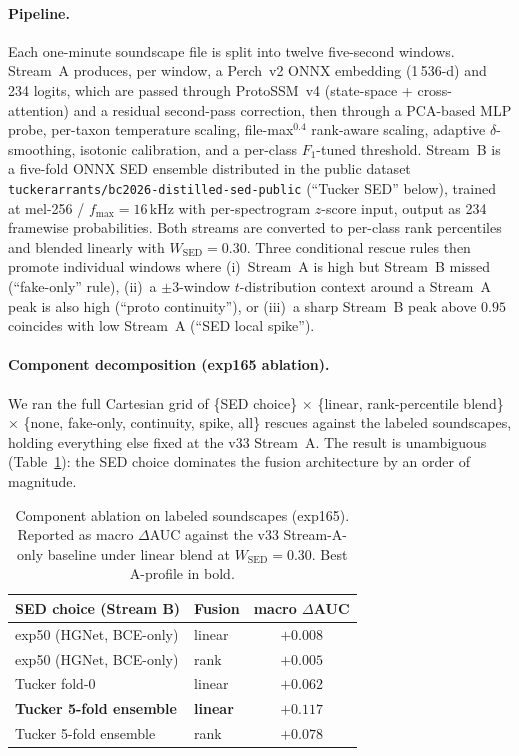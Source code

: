 \paragraph{Pipeline.}
Each one-minute soundscape file is split into twelve five-second
windows. Stream~A produces, per window, a Perch~v2 ONNX embedding
(1\,536-d) and 234 logits, which are passed through ProtoSSM~v4
(state-space + cross-attention) and a residual second-pass
correction, then through a PCA-based MLP probe, per-taxon
temperature scaling, file-max$^{0.4}$ rank-aware scaling, adaptive
$\delta$-smoothing, isotonic calibration, and a per-class
$F_1$-tuned threshold. Stream~B is a five-fold ONNX SED ensemble
distributed in the public dataset \texttt{tuckerarrants/bc2026-distilled-sed-public}
(``Tucker SED'' below), trained at mel-256 / $f_\text{max}=16$\,kHz
with per-spectrogram $z$-score input, output as 234 framewise
probabilities. Both streams are converted to per-class rank
percentiles and blended linearly with $W_\text{SED}=0.30$. Three
conditional rescue rules then promote individual windows where
(i)~Stream~A is high but Stream~B missed (``fake-only'' rule),
(ii)~a $\pm 3$-window $t$-distribution context around a
Stream~A peak is also high (``proto continuity''), or (iii)~a
sharp Stream~B peak above $0.95$ coincides with low Stream~A
(``SED local spike'').

\paragraph{Component decomposition (exp165 ablation).}
We ran the full Cartesian grid of \{SED choice\} $\times$
\{linear, rank-percentile blend\} $\times$ \{none, fake-only,
continuity, spike, all\} rescues against the labeled soundscapes,
holding everything else fixed at the v33 Stream~A. The result is
unambiguous (Table~\ref{tab:exp165}): the SED choice dominates the
fusion architecture by an order of magnitude.

\begin{table}[h]
\centering
\caption{Component ablation on labeled soundscapes (exp165).
Reported as macro $\Delta$AUC against the v33 Stream-A-only baseline
under linear blend at $W_\text{SED}=0.30$. Best A-profile in bold.}
\label{tab:exp165}
\begin{tabular}{llc}
\hline
SED choice (Stream B) & Fusion & macro $\Delta$AUC \\
\hline
exp50 (HGNet, BCE-only)         & linear  & $+0.008$ \\
exp50 (HGNet, BCE-only)         & rank    & $+0.005$ \\
Tucker fold-0                   & linear  & $+0.062$ \\
\textbf{Tucker 5-fold ensemble} & \textbf{linear} & $\mathbf{+0.117}$ \\
Tucker 5-fold ensemble          & rank    & $+0.078$ \\
\hline
\end{tabular}
\end{table}

